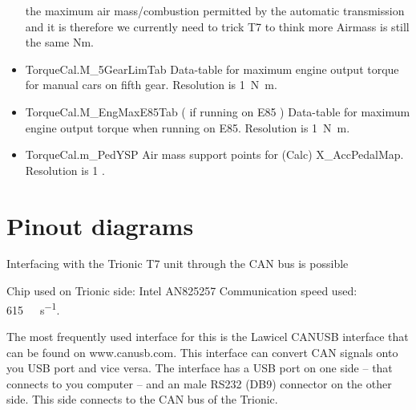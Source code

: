 \documentclass[11pt,a4paper]{book}
\begin{document}
\begin{itemize}
        the maximum air mass/combustion permitted by the automatic transmission and it is therefore we
        currently need to trick T7 to think more Airmass is still the same Nm.
    \item
        TorqueCal.M\_5GearLimTab
        Data-table for maximum engine output torque for manual cars on fifth gear.
        Resolution is \SI{1}{\newton\meter}.
    \item
        TorqueCal.M\_EngMaxE85Tab ( if running on E85 )
        Data-table for maximum engine output torque when running on E85. Resolution is
        \SI{1}{\newton\meter}.
    \item
        TorqueCal.m\_PedYSP
        Air mass support points for (Calc) X\_AccPedalMap. Resolution is 1 \si{\mgc}.
\end{itemize}

\chapter{Pinout diagrams}
Interfacing with the Trionic T7 unit through the CAN bus is possible

Chip used on Trionic side: Intel AN825257
Communication speed used: \SI{615}{\kilo\bit\per\second}.

The most frequently used interface for this is the Lawicel CANUSB interface that can be found on
www.canusb.com. This interface can convert CAN signals onto you USB port and vice versa. The
interface has a USB port on one side – that connects to you computer – and an male RS232 (DB9)
connector on the other side. This side connects to the CAN bus of the Trionic.
\end{document}
